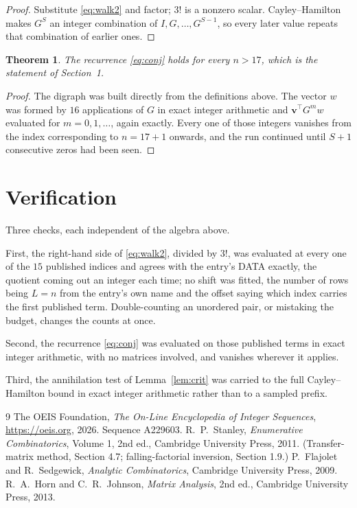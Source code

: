 \documentclass[11pt,a4paper]{article}
\theoremstyle{plain}
\newtheorem{theorem}{Theorem}
\theoremstyle{definition}
\begin{document}
\begin{proof}
Substitute \eqref{eq:walk2} and factor; $3!$ is a nonzero scalar. Cayley--Hamilton
makes $G^{S}$ an integer combination of $I,G,\dots,G^{S-1}$, so every later value repeats
that combination of earlier ones.
\end{proof}

\begin{theorem}
The recurrence \eqref{eq:conj} holds for every $n>17$, which is the statement of
Section~1.
\end{theorem}

\begin{proof}
The digraph was built directly from the definitions above. The vector $w$ was formed by
$16$ applications of $G$ in exact integer arithmetic and $\mathbf{v}^{\!\top}G^{m}w$
evaluated for $m=0,1,\dots$, again exactly. Every one of those integers vanishes from the
index corresponding to $n=17+1$ onwards, and the run continued until $S+1$ consecutive
zeros had been seen.
\end{proof}

\section{Verification}

Three checks, each independent of the algebra above.

First, the right-hand side of \eqref{eq:walk2}, divided by $3!$, was evaluated at every
one of the $15$ published indices and agrees with the entry's DATA exactly, the quotient
coming out an integer each time; no shift was fitted, the number of rows being $L=n$
from the entry's own name and the offset saying which index carries the first published term.
Double-counting an unordered pair, or mistaking the budget, changes the counts at once.

Second, the recurrence \eqref{eq:conj} was evaluated on those published terms in exact
integer arithmetic, with no matrices involved, and vanishes wherever it applies.

Third, the annihilation test of Lemma~\ref{lem:crit} was carried to the full
Cayley--Hamilton bound in exact integer arithmetic rather than to a sampled prefix.

\begin{thebibliography}{9}
 The OEIS Foundation, \emph{The On-Line Encyclopedia of Integer
Sequences}, \url{https://oeis.org}, 2026. Sequence A229603.
 R.~P.~Stanley, \emph{Enumerative Combinatorics}, Volume 1, 2nd ed.,
Cambridge University Press, 2011. (Transfer-matrix method, Section 4.7; falling-factorial
inversion, Section 1.9.)
 P.~Flajolet and R.~Sedgewick, \emph{Analytic Combinatorics}, Cambridge
University Press, 2009.
 R.~A.~Horn and C.~R.~Johnson, \emph{Matrix Analysis}, 2nd ed., Cambridge
University Press, 2013.
\end{thebibliography}
\end{document}
